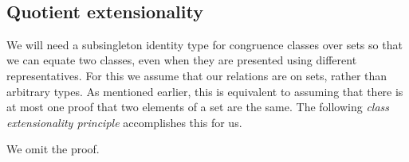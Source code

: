 \documentclass[a4paper,UKenglish,cleveref,autoref,thm-restate]{lipics-v2021}
\begin{document}
\ccpad
\begin{code}
\>[1]\AgdaSpace{}%
\AgdaSymbol{:}\AgdaSpace{}%
\AgdaSymbol{\{}\AgdaSpace{}%
\AgdaSymbol{:}\AgdaSpace{}%
\AgdaSpace{}%
\AgdaSymbol{\}\{}\AgdaSpace{}%
\AgdaSymbol{:}\AgdaSpace{}%
\AgdaSpace{}%
\AgdaSpace{}%
\AgdaSymbol{\}}\AgdaSpace{}%
\AgdaSpace{}%
\AgdaSpace{}%
\AgdaOperator{\AgdaFunction{/}}\AgdaSpace{}%
%
\>[39]\AgdaSpace{}%
\<%
\\
%
\>[1]\AgdaSpace{}%
\AgdaSpace{}%
\AgdaSpace{}%
\AgdaSymbol{=}\AgdaSpace{}%
\AgdaSpace{}%
\AgdaSpace{}%
\AgdaSpace{}%
\AgdaSpace{}%
%
\end{code}














\subsection{Quotient extensionality}\label{ssec:quotient-extensionality}
We will need a subsingleton identity type for congruence classes over sets so that we can equate two classes, even when they are presented using different representatives. For this we assume that our relations are on sets, rather than arbitrary types. As mentioned earlier, this is equivalent to assuming that there is at most one proof that two elements of a set are the same.  The following \emph{class extensionality principle} accomplishes this for us.
\ccpad
\begin{code}%

\end{code}
\ccpad
We omit the proof. \seedocfordetails
\end{document}
